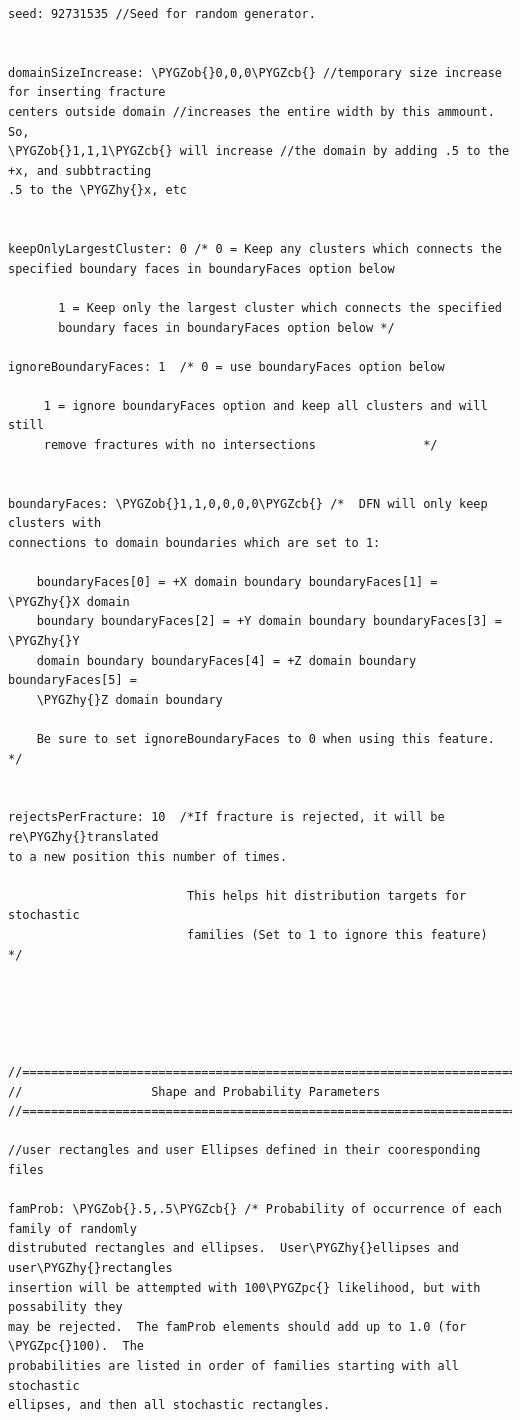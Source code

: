 \documentclass[letterpaper,10pt,english]{sphinxmanual}
\def\PYGZob{\char`\{}
\def\PYGZcb{\char`\}}
\def\PYGZpc{\char`\%}
\def\PYGZhy{\char`\-}
\begin{document}
\begin{Verbatim}[commandchars=\\\{\}]
seed: 92731535 //Seed for random generator.


domainSizeIncrease: \PYGZob{}0,0,0\PYGZcb{} //temporary size increase for inserting fracture
centers outside domain //increases the entire width by this ammount. So,
\PYGZob{}1,1,1\PYGZcb{} will increase //the domain by adding .5 to the +x, and subbtracting
.5 to the \PYGZhy{}x, etc


keepOnlyLargestCluster: 0 /* 0 = Keep any clusters which connects the
specified boundary faces in boundaryFaces option below

       1 = Keep only the largest cluster which connects the specified
       boundary faces in boundaryFaces option below */

ignoreBoundaryFaces: 1  /* 0 = use boundaryFaces option below

     1 = ignore boundaryFaces option and keep all clusters and will still
     remove fractures with no intersections               */


boundaryFaces: \PYGZob{}1,1,0,0,0,0\PYGZcb{} /*  DFN will only keep clusters with
connections to domain boundaries which are set to 1:

    boundaryFaces[0] = +X domain boundary boundaryFaces[1] = \PYGZhy{}X domain
    boundary boundaryFaces[2] = +Y domain boundary boundaryFaces[3] = \PYGZhy{}Y
    domain boundary boundaryFaces[4] = +Z domain boundary boundaryFaces[5] =
    \PYGZhy{}Z domain boundary

    Be sure to set ignoreBoundaryFaces to 0 when using this feature.     */


rejectsPerFracture: 10  /*If fracture is rejected, it will be re\PYGZhy{}translated
to a new position this number of times.

                         This helps hit distribution targets for stochastic
                         families (Set to 1 to ignore this feature)    */





//===========================================================================
//                  Shape and Probability Parameters
//===========================================================================

//user rectangles and user Ellipses defined in their cooresponding files

famProb: \PYGZob{}.5,.5\PYGZcb{} /* Probability of occurrence of each family of randomly
distrubuted rectangles and ellipses.  User\PYGZhy{}ellipses and user\PYGZhy{}rectangles
insertion will be attempted with 100\PYGZpc{} likelihood, but with possability they
may be rejected.  The famProb elements should add up to 1.0 (for \PYGZpc{}100).  The
probabilities are listed in order of families starting with all stochastic
ellipses, and then all stochastic rectangles.


\end{Verbatim}
\end{document}
